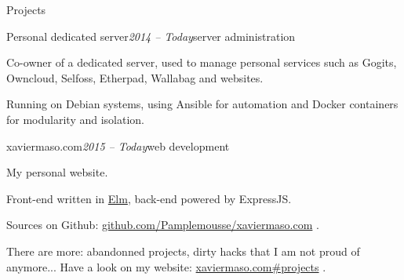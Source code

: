 \begin{rSection}{Projects}

  \begin{rSubsection}{Personal dedicated server}{\em 2014 -- Today}{server administration}{}
    \item[] Co-owner of a dedicated server, used to manage personal services such as Gogits, Owncloud, Selfoss, Etherpad, Wallabag and websites.
    \item Running on Debian systems, using Ansible for automation and Docker containers for modularity and isolation.
  \end{rSubsection}

  \begin{rSubsection}{xaviermaso.com}{\em 2015 -- Today}{web development}{}
    \item[] My personal website.
    \item Front-end written in \href{http://elm-lang.org/}{Elm}, back-end powered by ExpressJS.
    \item Sources on Github: \href{https://github.com/Pamplemousse/xaviermaso.com}{github.com/Pamplemousse/xaviermaso.com} .
  \end{rSubsection}

  \begin{rSubsection}{}{}{}{}
  \item[] There are more: abandonned projects, dirty hacks that I am not proud of anymore... Have a look on my website: \href{http://xaviermaso.com#projects}{xaviermaso.com\#projects} .
  \end{rSubsection}

\end{rSection}
